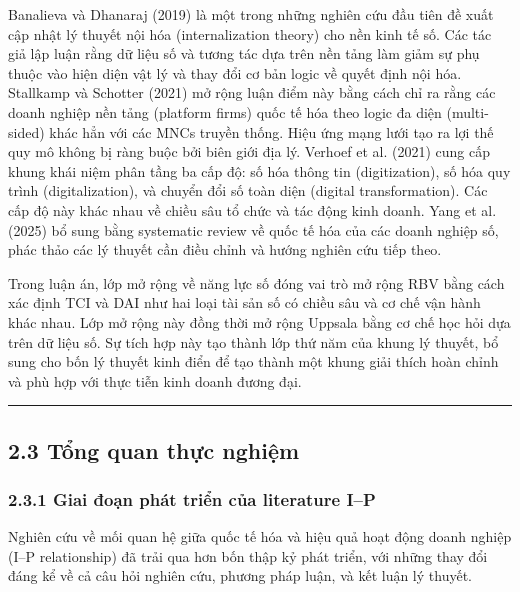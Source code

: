 \documentclass[12pt,a4paper]{article}
\begin{document}
Banalieva và Dhanaraj (2019) là một trong những nghiên cứu đầu tiên đề
xuất cập nhật lý thuyết nội hóa (internalization theory) cho nền kinh tế
số. Các tác giả lập luận rằng dữ liệu số và tương tác dựa trên nền tảng
làm giảm sự phụ thuộc vào hiện diện vật lý và thay đổi cơ bản logic về
quyết định nội hóa. Stallkamp và Schotter (2021) mở rộng luận điểm này
bằng cách chỉ ra rằng các doanh nghiệp nền tảng (platform firms) quốc tế
hóa theo logic đa diện (multi-sided) khác hẳn với các MNCs truyền thống.
Hiệu ứng mạng lưới tạo ra lợi thế quy mô không bị ràng buộc bởi biên
giới địa lý. Verhoef et al. (2021) cung cấp khung khái niệm phân tầng ba
cấp độ: số hóa thông tin (digitization), số hóa quy trình
(digitalization), và chuyển đổi số toàn diện (digital transformation).
Các cấp độ này khác nhau về chiều sâu tổ chức và tác động kinh doanh.
Yang et al. (2025) bổ sung bằng systematic review về quốc tế hóa của các
doanh nghiệp số, phác thảo các lý thuyết cần điều chỉnh và hướng nghiên
cứu tiếp theo.

Trong luận án, lớp mở rộng về năng lực số đóng vai trò mở rộng RBV bằng
cách xác định TCI và DAI như hai loại tài sản số có chiều sâu và cơ chế
vận hành khác nhau. Lớp mở rộng này đồng thời mở rộng Uppsala bằng cơ
chế học hỏi dựa trên dữ liệu số. Sự tích hợp này tạo thành lớp thứ năm
của khung lý thuyết, bổ sung cho bốn lý thuyết kinh điển để tạo thành
một khung giải thích hoàn chỉnh và phù hợp với thực tiễn kinh doanh
đương đại.

\begin{center}\rule{0.5\linewidth}{0.5pt}\end{center}

\hypertarget{23-tux1ed5ng-quan-thux1ef1c-nghiux1ec7m}{%
\subsection{2.3 Tổng quan thực
nghiệm}\label{23-tux1ed5ng-quan-thux1ef1c-nghiux1ec7m}}

\hypertarget{231-giai-ux111oux1ea1n-phuxe1t-triux1ec3n-cux1ee7a-literature-ip}{%
\subsubsection{2.3.1 Giai đoạn phát triển của literature
I--P}\label{231-giai-ux111oux1ea1n-phuxe1t-triux1ec3n-cux1ee7a-literature-ip}}

Nghiên cứu về mối quan hệ giữa quốc tế hóa và hiệu quả hoạt động doanh
nghiệp (I--P relationship) đã trải qua hơn bốn thập kỷ phát triển, với
những thay đổi đáng kể về cả câu hỏi nghiên cứu, phương pháp luận, và
kết luận lý thuyết.
\end{document}
